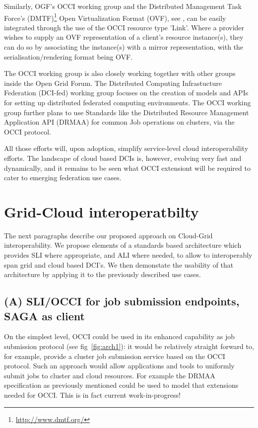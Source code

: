 \documentclass[10pt,conference,final,letterpaper,twoside,twocolumn,]{IEEEtran}
\begin{document}
 Similarly, OGF's OCCI working group and the Distributed Management
 Task Force's (DMTF)\footnote{\url{http://www.dmtf.org/}} Open
 Virtualization Format (OVF), see \cite{CDG+2009}, can be easily
 integrated through the use of the OCCI resource type 'Link'.  Where a
 provider wishes to supply an OVF representation of a client's
 resource instance(s), they can do so by associating the instance(s)
 with a mirror representation, with the serialisation/rendering format
 being OVF.
 
 The OCCI working group is also closely working together with other
 groups inside the Open Grid Forum. The Distributed Computing
 Infrastucture Federation (DCI-fed) working group focuses on the
 creation of models and APIs for setting up distributed federated
 computing environments. The OCCI working group further plans to use
 Standards like the Distributed Resource Management Application API
 (DRMAA) for common Job operations on clusters, via the OCCI protocol.
 
 All those efforts will, upon adoption, simplify service-level cloud
 interoperability efforts.  The landscape of cloud based DCIs is,
 however, evolving very fast and dynamically, and it remains to be
 seen what OCCI extensiont will be required to cater to emerging
 federation use cases.
 
 
\section{Grid-Cloud interoperatbilty}
\label{sec:gcinterop}
 
 The next paragraphs describe our proposed approach on Cloud-Grid
 interoperability. We propose elements of a standards based
 architecture which provides SLI where appropriate, and ALI where
 needed, to allow to interoperably span grid and cloud based DCI's.
 We then demonstate the usability of that architecture by applying it
 to the previously described use cases.
 
 \subsection{(A) SLI/OCCI for job submission endpoints, SAGA as client}
 
 On the simplest level, OCCI could be used in its enhanced capability
 as job submission protocol (see fig~\ref{fig:arch1}): it would be
 relatively straight forward to, for example, provide a cluster job
 submission service based on the OCCI protocol. Such an approach would
 allow applications and tools to uniformly submit jobs to cluster and
 cloud resources. For example the DRMAA specification as previously
 mentioned could be used to model that extensions needed for OCCI.
 This is in fact current work-in-progress!
 
\end{document}

